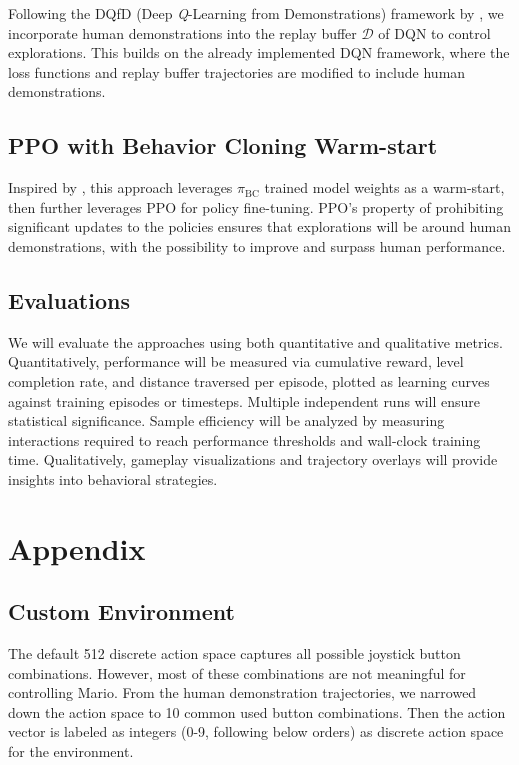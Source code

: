 \documentclass{article}
\begin{document}
Following the DQfD (Deep \textit{Q}-Learning from Demonstrations) framework by 
\cite{hester_dqfd_2017}, we incorporate human demonstrations into the replay 
buffer $\mathcal{D}$ of DQN to control explorations. This builds on the already 
implemented DQN framework, where the loss functions and replay buffer 
trajectories are modified to include human demonstrations.

\subsection{PPO with Behavior Cloning Warm-start}

Inspired by \cite{Coletti2023EffectivenessOW}, this approach leverages 
$\pi_{\text{BC}}$ trained model weights as a warm-start, then further leverages 
PPO for policy fine-tuning. PPO's property of 
prohibiting significant updates to the policies ensures that explorations will 
be around human demonstrations, with the possibility to improve and surpass 
human performance.

\subsection{Evaluations}
We will evaluate the approaches using both quantitative and qualitative metrics. 
Quantitatively, performance will be measured via cumulative reward, level 
completion rate, and distance traversed per episode, plotted as learning curves 
against training episodes or timesteps. Multiple independent runs will ensure 
statistical significance. Sample efficiency will be analyzed by measuring 
interactions required to reach performance thresholds and wall-clock training 
time. Qualitatively, gameplay visualizations and trajectory overlays will 
provide insights into behavioral strategies.





\clearpage
\appendix
\renewcommand{\thefigure}{A\arabic{figure}}
\renewcommand{\thetable}{A\arabic{table}}
\setcounter{figure}{0}
\setcounter{table}{0}
\onecolumn
\section{Appendix}
\subsection{Custom Environment}
\label{a1:custom_env}

The default 512 discrete action space captures all possible joystick button 
combinations. However, most of these combinations are not meaningful for 
controlling Mario. From the human demonstration trajectories, we narrowed down 
the action space to 10 common used button combinations.
Then the action vector is labeled as integers (0-9, following below orders)
as discrete action space for the environment.
\end{document}
